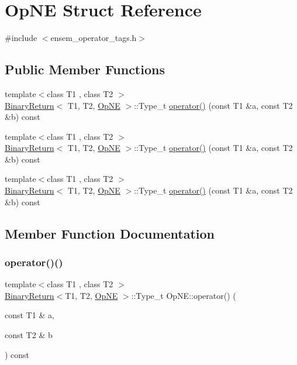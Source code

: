 \hypertarget{structOpNE}{}\section{Op\+NE Struct Reference}
\label{structOpNE}


{\ttfamily \#include $<$ensem\+\_\+operator\+\_\+tags.\+h$>$}

\subsection*{Public Member Functions}
\begin{DoxyCompactItemize}
\item 
{\footnotesize template$<$class T1 , class T2 $>$ }\\\mbox{\hyperlink{structBinaryReturn}{Binary\+Return}}$<$ T1, T2, \mbox{\hyperlink{structOpNE}{Op\+NE}} $>$\+::Type\+\_\+t \mbox{\hyperlink{structOpNE_ae32186e8a2a30c388bbe8af0eea8e4c2}{operator()}} (const T1 \&a, const T2 \&b) const
\item 
{\footnotesize template$<$class T1 , class T2 $>$ }\\\mbox{\hyperlink{structBinaryReturn}{Binary\+Return}}$<$ T1, T2, \mbox{\hyperlink{structOpNE}{Op\+NE}} $>$\+::Type\+\_\+t \mbox{\hyperlink{structOpNE_ae32186e8a2a30c388bbe8af0eea8e4c2}{operator()}} (const T1 \&a, const T2 \&b) const
\item 
{\footnotesize template$<$class T1 , class T2 $>$ }\\\mbox{\hyperlink{structBinaryReturn}{Binary\+Return}}$<$ T1, T2, \mbox{\hyperlink{structOpNE}{Op\+NE}} $>$\+::Type\+\_\+t \mbox{\hyperlink{structOpNE_ae32186e8a2a30c388bbe8af0eea8e4c2}{operator()}} (const T1 \&a, const T2 \&b) const
\end{DoxyCompactItemize}


\subsection{Member Function Documentation}
\mbox{\label{structOpNE_ae32186e8a2a30c388bbe8af0eea8e4c2}} 
\subsubsection{\texorpdfstring{operator()()}{operator()()}\hspace{0.1cm}{\footnotesize\ttfamily [1/3]}}
{\footnotesize\ttfamily template$<$class T1 , class T2 $>$ \\
\mbox{\hyperlink{structBinaryReturn}{Binary\+Return}}$<$T1, T2, \mbox{\hyperlink{structOpNE}{Op\+NE}} $>$\+::Type\+\_\+t Op\+N\+E\+::operator() (\begin{DoxyParamCaption}\item[{const T1 \&}]{a,  }\item[{const T2 \&}]{b }\end{DoxyParamCaption}) const\hspace{0.3cm}{\ttfamily [inline]}}

